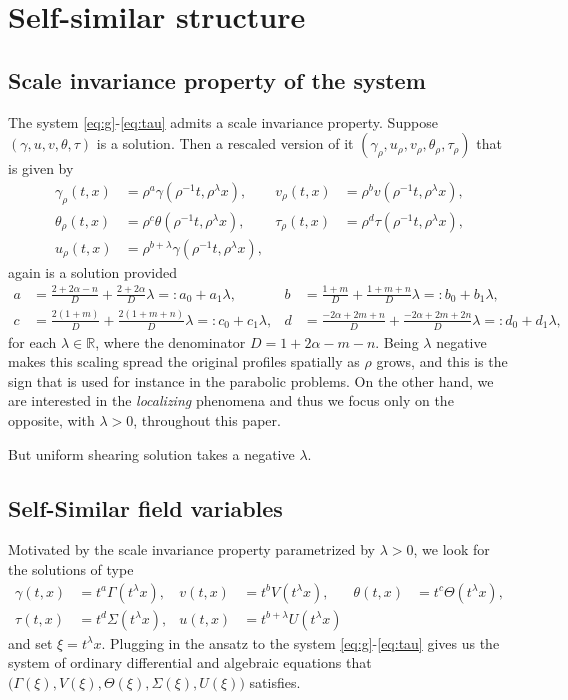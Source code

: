 \documentclass[a4paper,11pt]{article}
\begin{document}
\section{Self-similar structure}

\subsection{Scale invariance property of the system}
The system \eqref{eq:g}-\eqref{eq:tau} admits a scale invariance property. Suppose $(\gamma,u,v,\theta,\tau)$ is a solution. Then a rescaled version of it $(\gamma_\rho,u_\rho,v_\rho,\theta_\rho,\tau_\rho)$ that is given by
\begin{align*}
 \gamma_\rho(t,x) &= \rho^a\gamma(\rho^{-1}t,\rho^\lambda x), &
 v_\rho(t,x) &= \rho^bv(\rho^{-1}t,\rho^\lambda x),\\
 \theta_\rho(t,x) &= \rho^c\theta(\rho^{-1}t,\rho^\lambda x), &
 \tau_\rho(t,x) &= \rho^d\tau(\rho^{-1}t,\rho^\lambda x),\\
 u_\rho(t,x) &= \rho^{b+\lambda}\gamma(\rho^{-1}t,\rho^\lambda x),
\end{align*}
again is a solution provided
\begin{align*}
 a&= \frac{2+2\alpha-n}{D} + \frac{2+2\alpha}{D}\lambda =: a_0 + a_1 \lambda, & b&=\frac{1+m}{D} + \frac{1+m+n}{D}\lambda =: b_0 + b_1\lambda,\\
 c&=\frac{2(1+m)}{D} + \frac{2(1+m+n)}{D}\lambda =: c_0 + c_1\lambda, & d&=\frac{-2\alpha + 2m +n}{D} + \frac{-2\alpha+2m+2n}{D}\lambda =: d_0 + d_1\lambda,
\end{align*}
for each $\lambda \in \mathbb{R}$, where the denominator $D = 1+2\alpha-m-n$. Being $\lambda$ negative makes this scaling spread the original profiles spatially as $\rho$ grows, and this is the sign that is used for instance in the parabolic problems. On the other hand, we are interested in the {\it localizing} phenomena and thus we focus only on the opposite, with $\lambda>0$, throughout this paper.

 But uniform shearing solution takes a negative $\lambda$.
\subsection{Self-Similar field variables}
Motivated by the scale invariance property parametrized by $\lambda>0$, we look for the solutions of type
\begin{equation}\label{eq:ORItoCAP}
\begin{aligned}
 \gamma(t,x) &= t^a\Gamma(t^\lambda x), & v(t,x) &= t^b V(t^\lambda x), &\theta(t,x) &= t^c \Theta(t^\lambda x),\\
 \tau(t,x) &= t^d \Sigma(t^\lambda x), & u(t,x) &= t^{b+\lambda} U(t^\lambda x)
\end{aligned}
\end{equation}
and set $\xi = t^\lambda x$. Plugging in the ansatz to the system \eqref{eq:g}-\eqref{eq:tau} gives us the system of ordinary differential and algebraic equations that $\big(\Gamma(\xi), V(\xi), \Theta(\xi), \Sigma(\xi), U(\xi)\big)$ satisfies.
\end{document}
